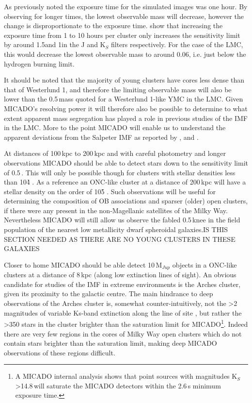 As previously noted the exposure time for the simulated images was one hour. 
By observing for longer times, the lowest observable mass will decrease, however the change is disproportionate to the exposure time. 
\citet{leschinski2016} show that increasing the exposure time from 1 to 10 hours per cluster only increases the sensitivity limit by around 1.5\m and 1\m in the J and K$_S$ filters respectively. 
For the case of the LMC, this would decrease the lowest observable mass to around 0.06\msune, i.e. just below the hydrogen burning limit.

It should be noted that the majority of young clusters have cores less dense than that of Westerlund 1, and therefore the limiting observable mass will also be lower than the 0.5\,\msun mass quoted for a Westerlund 1-like YMC in the LMC. 
Given MICADO's resolving power it will therefore also be possible to determine to what extent apparent mass segregation has played a role in previous studies of the IMF in the LMC.\needcite 
More to the point MICADO will enable us to understand the apparent deviations from the Salpeter IMF as reported by \citet{dario2009}, \citet{geha2013} and \citet{kalirai2013}.

At distances of 100\,kpc to 200\,kpc and with careful photometry and longer observations MICADO should be able to detect stars down to the sensitivity limit of 0.5\,\msun. 
This will only be possible though for clusters with stellar densities less than 10\h4 \spa. 
As a reference an ONC-like cluster at a distance of 200\,kpc will have a stellar density on the order of 10\h5 \spa. 
Such observations will be useful for determining the composition of OB associations and sparser (older) open clusters, if there were any present in the non-Magellanic satellites of the Milky Way. 
Nevertheless MICADO will still allow us observe the fabled 0.5\,\msun knee in the field population of the nearest low metallicity dwarf spheroidal galaxies.\rewrite IS THIS SECTION NEEDED AS THERE ARE NO YOUNG CLUSTERS IN THESE GALAXIES

Closer to home MICADO should be able detect 10\,M$_{Jup}$ objects in a ONC-like clusters at a distance of 8\,kpc (along low extinction lines of sight). 
An obvious candidate for studies of the IMF in extreme environments is the Arches cluster, given its proximity to the galactic centre.
The main hindrance to deep observations of the Arches cluster is, somewhat counter-intuitively, not the \textgreater2 magnitudes of variable Ks-band extinction along the line of site \citep{espinoza2009}, but rather the \textgreater350 stars in the cluster \citep{galacticnucleaus} brighter than the saturation limit for MICADO\footnote{A MICADO internal analysis shows that point sources with magnitudes K$_S$\textgreater14.8\,\m will saturate the MICADO detectors within the 2.6\,s minimum exposure time.}.
Indeed there are very few regions in the cores of Milky Way open clusters which do not contain stars brighter than the saturation limit, making deep MICADO observations of these regions difficult.


